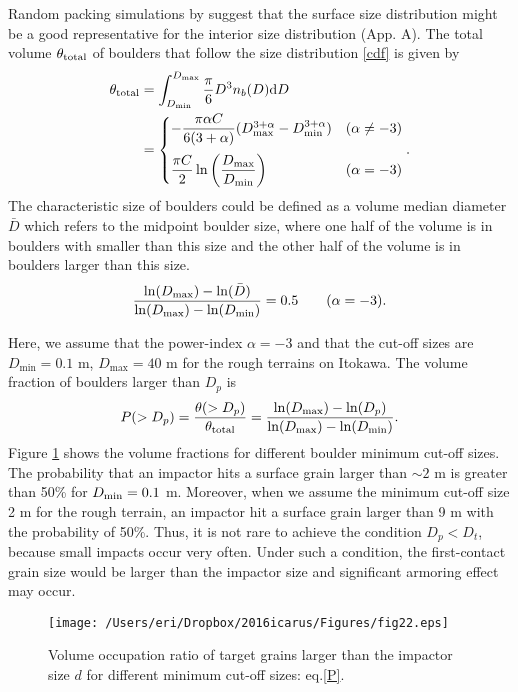 \documentclass[3p,authoryear]{elsarticle}
\renewcommand{\d}{{\rm{d}}}
\begin{document}
Random packing simulations by \citet{tancredi2015} suggest that the surface size distribution might be a good representative for the interior size distribution (App. A).
The total volume $\theta_{\rm total}$ of boulders that follow the size distribution \eqref{cdf} is given by
\begin{align}
	\theta_\text{total}&=\int_{D_{\rm min}}^{D_{\rm max}} \frac{\pi}{6} D^3 n_b(D) {\rm d} D \notag \\
	&=\begin{cases} -\dfrac{\pi \alpha C}{6(3+\alpha)} (D_{\rm max}^{3+\alpha}-D_{\rm min}^{3+\alpha})& (\alpha\neq -3) \medskip\\
	\dfrac{\pi C}{2}\ln\left(\dfrac{D_{\rm max}}{D_{\rm min}}\right) & (\alpha=-3) \end{cases} .
\end{align}
The characteristic size of boulders could be defined as a volume median diameter $\bar{D}$ which refers to the midpoint boulder size, where one half of the volume is in boulders with smaller than this size and the other half of the volume is in boulders larger than this size.
\begin{equation}
	\frac{\ln (D_{\rm max})-\ln (\bar{D})}{\ln (D_{\rm max})-\ln (D_{\rm min})}=0.5\qquad (\alpha=-3).
\end{equation}

Here, we assume that the power-index $\alpha =-3$ and that the cut-off sizes are $D_\text{min}=0.1$ m, $D_\text{max}=40$ m for the rough terrains on Itokawa.
The volume fraction of boulders larger than $D_p$ is
\begin{equation}
	P(>D_p) = \frac{\theta(>D_p)}{\theta_\text{total}}=\frac{\ln (D_{\rm max})-\ln (D_p)}{\ln (D_{\rm max})-\ln (D_{\rm min})}. \label{P}
\end{equation}
Figure \ref{graph-P} shows the volume fractions for different boulder minimum cut-off sizes.
The probability that an impactor hits a surface grain larger than $\sim2$ m is greater than 50\% for $D_{\rm min}=0.1$ m.
Moreover, when we assume the minimum cut-off size 2 m for the rough terrain, an impactor hit a surface grain larger than 9 m with the probability of 50\%.
Thus, it is not rare to achieve the condition $D_p<D_t$, because small impacts occur very often.
Under such a condition, the first-contact grain size would be larger than the impactor size and significant armoring effect may occur.
\begin{figure}[htbp]
	\begin{center}
	\texttt{[image: /Users/eri/Dropbox/2016icarus/Figures/fig22.eps]}
	\caption{Volume occupation ratio of target grains larger than the impactor size $d$ for different minimum cut-off sizes: eq.\eqref{P}.}
	\label{graph-P}
	\end{center}
\end{figure}
\end{document}
